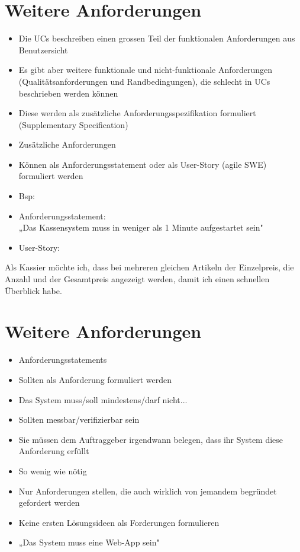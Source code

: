 \documentclass[10pt]{article}
\begin{document}
\section*{Weitere Anforderungen}
\begin{itemize}
  \item Die UCs beschreiben einen grossen Teil der funktionalen Anforderungen aus Benutzersicht
  \item Es gibt aber weitere funktionale und nicht-funktionale Anforderungen (Qualitätsanforderungen und Randbedingungen), die schlecht in UCs beschrieben werden können
  \item Diese werden als zusätzliche Anforderungsspezifikation formuliert (Supplementary Specification)
  \item Zusätzliche Anforderungen
  \item Können als Anforderungsstatement oder als User-Story (agile SWE) formuliert werden
  \item Bsp:
  \item Anforderungsstatement:\\
„Das Kassensystem muss in weniger als 1 Minute aufgestartet sein"
  \item User-Story:
\end{itemize}

Als Kassier möchte ich, dass bei mehreren gleichen Artikeln der Einzelpreis, die Anzahl und der Gesamtpreis angezeigt werden, damit ich einen schnellen Überblick habe.

\section*{Weitere Anforderungen}
\begin{itemize}
  \item Anforderungsstatements
  \item Sollten als Anforderung formuliert werden
  \item Das System muss/soll mindestens/darf nicht...
  \item Sollten messbar/verifizierbar sein
  \item Sie müssen dem Auftraggeber irgendwann belegen, dass ihr System diese Anforderung erfüllt
  \item So wenig wie nötig
  \item Nur Anforderungen stellen, die auch wirklich von jemandem begründet gefordert werden
  \item Keine ersten Lösungsideen als Forderungen formulieren
  \item „Das System muss eine Web-App sein"
\end{itemize}
\end{document}
